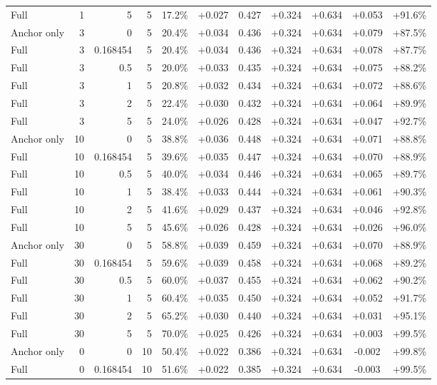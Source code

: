 \begin{table}[htbp]
\begin{tabular}{lrrrccccccc}
Full & 1 & 5 & 5 & 17.2\% & +0.027 & 0.427 & +0.324 & +0.634 & +0.053 & +91.6\% \\
Anchor only & 3 & 0 & 5 & 20.4\% & +0.034 & 0.436 & +0.324 & +0.634 & +0.079 & +87.5\% \\
Full & 3 & 0.168454 & 5 & 20.4\% & +0.034 & 0.436 & +0.324 & +0.634 & +0.078 & +87.7\% \\
Full & 3 & 0.5 & 5 & 20.0\% & +0.033 & 0.435 & +0.324 & +0.634 & +0.075 & +88.2\% \\
Full & 3 & 1 & 5 & 20.8\% & +0.032 & 0.434 & +0.324 & +0.634 & +0.072 & +88.6\% \\
Full & 3 & 2 & 5 & 22.4\% & +0.030 & 0.432 & +0.324 & +0.634 & +0.064 & +89.9\% \\
Full & 3 & 5 & 5 & 24.0\% & +0.026 & 0.428 & +0.324 & +0.634 & +0.047 & +92.7\% \\
Anchor only & 10 & 0 & 5 & 38.8\% & +0.036 & 0.448 & +0.324 & +0.634 & +0.071 & +88.8\% \\
Full & 10 & 0.168454 & 5 & 39.6\% & +0.035 & 0.447 & +0.324 & +0.634 & +0.070 & +88.9\% \\
Full & 10 & 0.5 & 5 & 40.0\% & +0.034 & 0.446 & +0.324 & +0.634 & +0.065 & +89.7\% \\
Full & 10 & 1 & 5 & 38.4\% & +0.033 & 0.444 & +0.324 & +0.634 & +0.061 & +90.3\% \\
Full & 10 & 2 & 5 & 41.6\% & +0.029 & 0.437 & +0.324 & +0.634 & +0.046 & +92.8\% \\
Full & 10 & 5 & 5 & 45.6\% & +0.026 & 0.428 & +0.324 & +0.634 & +0.026 & +96.0\% \\
Anchor only & 30 & 0 & 5 & 58.8\% & +0.039 & 0.459 & +0.324 & +0.634 & +0.070 & +88.9\% \\
Full & 30 & 0.168454 & 5 & 59.6\% & +0.039 & 0.458 & +0.324 & +0.634 & +0.068 & +89.2\% \\
Full & 30 & 0.5 & 5 & 60.0\% & +0.037 & 0.455 & +0.324 & +0.634 & +0.062 & +90.2\% \\
Full & 30 & 1 & 5 & 60.4\% & +0.035 & 0.450 & +0.324 & +0.634 & +0.052 & +91.7\% \\
Full & 30 & 2 & 5 & 65.2\% & +0.030 & 0.440 & +0.324 & +0.634 & +0.031 & +95.1\% \\
Full & 30 & 5 & 5 & 70.0\% & +0.025 & 0.426 & +0.324 & +0.634 & +0.003 & +99.5\% \\
Anchor only & 0 & 0 & 10 & 50.4\% & +0.022 & 0.386 & +0.324 & +0.634 & -0.002 & +99.8\% \\
Full & 0 & 0.168454 & 10 & 51.6\% & +0.022 & 0.385 & +0.324 & +0.634 & -0.003 & +99.5\% \\

\end{tabular}
\end{table}
